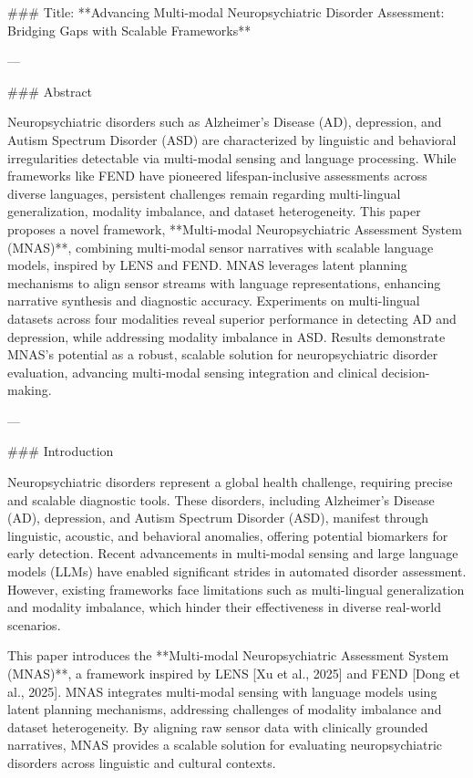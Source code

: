 ### Title: **Advancing Multi-modal Neuropsychiatric Disorder Assessment: Bridging Gaps with Scalable Frameworks**

---

### Abstract

Neuropsychiatric disorders such as Alzheimer’s Disease (AD), depression, and Autism Spectrum Disorder (ASD) are characterized by linguistic and behavioral irregularities detectable via multi-modal sensing and language processing. While frameworks like FEND have pioneered lifespan-inclusive assessments across diverse languages, persistent challenges remain regarding multi-lingual generalization, modality imbalance, and dataset heterogeneity. This paper proposes a novel framework, **Multi-modal Neuropsychiatric Assessment System (MNAS)**, combining multi-modal sensor narratives with scalable language models, inspired by LENS and FEND. MNAS leverages latent planning mechanisms to align sensor streams with language representations, enhancing narrative synthesis and diagnostic accuracy. Experiments on multi-lingual datasets across four modalities reveal superior performance in detecting AD and depression, while addressing modality imbalance in ASD. Results demonstrate MNAS’s potential as a robust, scalable solution for neuropsychiatric disorder evaluation, advancing multi-modal sensing integration and clinical decision-making.

---

### Introduction

Neuropsychiatric disorders represent a global health challenge, requiring precise and scalable diagnostic tools. These disorders, including Alzheimer’s Disease (AD), depression, and Autism Spectrum Disorder (ASD), manifest through linguistic, acoustic, and behavioral anomalies, offering potential biomarkers for early detection. Recent advancements in multi-modal sensing and large language models (LLMs) have enabled significant strides in automated disorder assessment. However, existing frameworks face limitations such as multi-lingual generalization and modality imbalance, which hinder their effectiveness in diverse real-world scenarios.

This paper introduces the **Multi-modal Neuropsychiatric Assessment System (MNAS)**, a framework inspired by LENS [Xu et al., 2025] and FEND [Dong et al., 2025]. MNAS integrates multi-modal sensing with language models using latent planning mechanisms, addressing challenges of modality imbalance and dataset heterogeneity. By aligning raw sensor data with clinically grounded narratives, MNAS provides a scalable solution for evaluating neuropsychiatric disorders across linguistic and cultural contexts.

